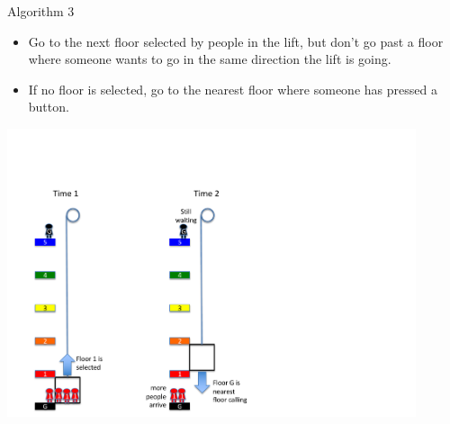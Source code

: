 \documentclass{beamer} %
\begin{document}
\begin{frame}
  \vspace{-11mm}
  \begin{block}{Algorithm 3}
    \begin{itemize}
      \vspace{-1mm}
      \item \small Go to the next floor selected by people in the lift, but don't go past a floor where someone wants to go in the same direction the lift is going.
      \vspace{-1mm}
      \item \small If no floor is selected, go to the nearest floor where someone has pressed a button.
      \vspace{-1mm}
    \end{itemize}
  \end{block}
  \centering
  \includegraphics[width=120mm, trim=0mm 0mm 0mm 50mm, clip=true]{img/lift2-anim8.pdf}

\end{frame}
\end{document}
